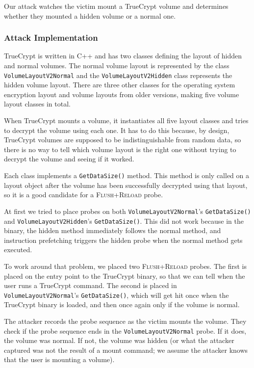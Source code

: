 \documentclass[letterpaper,twocolumn,10pt]{article}
\begin{document}
Our attack watches the victim mount a TrueCrypt volume and determines whether
they mounted a hidden volume or a normal one.

\subsubsection{Attack Implementation}

TrueCrypt is written in C++ and has two classes defining the layout of hidden
and normal volumes. The normal volume layout is represented by the class
\texttt{VolumeLayoutV2Normal} and the \texttt{VolumeLayoutV2Hidden} class
represents the hidden volume layout. There are three other classes for the
operating system encryption layout and volume layouts from older versions,
making five volume layout classes in total.

When TrueCrypt mounts a volume, it instantiates all five layout classes and
tries to decrypt the volume using each one. It has to do this because, by
design, TrueCrypt volumes are supposed to be indistinguishable from random data,
so there is no way to tell which volume layout is the right one without trying
to decrypt the volume and seeing if it worked.

Each class implements a \texttt{GetDataSize()} method. This method is only
called on a layout object after the volume has been successfully decrypted using
that layout, so it is a good candidate for a \textsc{Flush+Reload} probe.

At first we tried to place probes on both \texttt{VolumeLayoutV2Normal}'s
\texttt{GetDataSize()} and \texttt{VolumeLayoutV2Hidden}'s
\texttt{GetDataSize()}. This did not work because in the binary, the hidden
method immediately follows the normal method, and instruction prefetching
triggers the hidden probe when the normal method gets executed.

To work around that problem, we placed two \textsc{Flush+Reload} probes. The
first is placed on the entry point to the TrueCrypt binary, so that we can tell
when the user runs a TrueCrypt command. The second is placed in
\texttt{VolumeLayoutV2Normal}'s \texttt{GetDataSize()}, which will get hit once
when the TrueCrypt binary is loaded, and then once again only if the volume is
normal.

The attacker records the probe sequence as the victim mounts the volume. They
check if the probe sequence ends in the \texttt{VolumeLayoutV2Normal} probe. If
it does, the volume was normal. If not, the volume was hidden (or what the
attacker captured was not the result of a mount command; we assume the attacker
knows that the user is mounting a volume).
\end{document}
